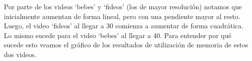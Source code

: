 \begin{figure}[ht]
	\begin{center}
	\end{center}
\end{figure}
\FloatBarrier
\par Por parte de los videos `bebes' y `fideos' (los de mayor resoluci\'on) notamos que inicialmente aumentan de forma lineal, pero con una pendiente mayor al resto. Luego, el video `fideos' al llegar a 30 comienza a aumentar de forma cuadr\'atica. Lo mismo sucede para el video `bebes' al llegar a 40. Para entender por qu\'e sucede esto veamos el gr\'afico de los resultados de utilizaci\'on de memoria de estos dos videos.
\begin{figure}[ht]
	\begin{center}
	\end{center}
\end{figure}
